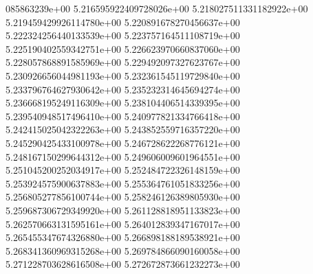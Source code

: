 085863239e+00	5.216595922409728026e+00	5.218027511331182922e+00	5.219459429926114780e+00	5.220891678270456637e+00	5.222324256440133539e+00	5.223757164511108719e+00	5.225190402559342751e+00	5.226623970660837060e+00	5.228057868891585969e+00	5.229492097327623767e+00	5.230926656044981193e+00	5.232361545119729840e+00	5.233796764627930642e+00	5.235232314645694274e+00	5.236668195249116309e+00	5.238104406514339395e+00	5.239540948517496410e+00	5.240977821334766418e+00	5.242415025042322263e+00	5.243852559716357220e+00	5.245290425433100978e+00	5.246728622268776121e+00	5.248167150299644312e+00	5.249606009601964551e+00	5.251045200252034917e+00	5.252484722326148159e+00	5.253924575900637883e+00	5.255364761051833256e+00	5.256805277856100744e+00	5.258246126389805930e+00	5.259687306729349920e+00	5.261128818951133823e+00	5.262570663131595161e+00	5.264012839347167017e+00	5.265455347674326880e+00	5.266898188189538921e+00	5.268341360969315268e+00	5.269784866090160058e+00	5.271228703628616508e+00	5.272672873661232273e+00
